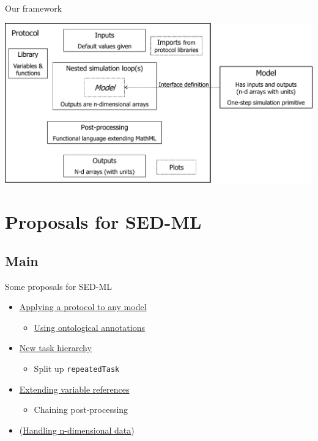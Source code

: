 \documentclass[t,xcolor={usenames,dvipsnames}]{beamer}
\newcommand{\sedml}[1]{\lstinline[basicstyle=\color{blue}]!#1!}
\newcommand{\subitem}[1]{\begin{itemize}[<.->]\item #1 \end{itemize}}
\begin{document}
\begin{frame}{Our framework}
\begin{center}
\vspace{-.5cm}\hspace*{-.75cm}\includegraphics[width=1.15\textwidth]{proto_diag}
\end{center}
\end{frame}

\section{Proposals for SED-ML}
\subsection*{Main}

\begin{frame}{Some proposals for SED-ML}
\begin{itemize}
\item \hyperlink{prop:anymodel}{Applying a protocol to any model}
  \subitem{\hyperlink{prop:onto}{Using ontological annotations}}
\item \hyperlink{prop:tasks}{New task hierarchy}
  \subitem{Split up \sedml{repeatedTask}}
\item \hyperlink{prop:varref}{Extending variable references}
  \subitem{Chaining post-processing}
\item (\hyperlink{prop:nd}{Handling n-dimensional data})
\end{itemize}
\end{frame}

\end{document}
